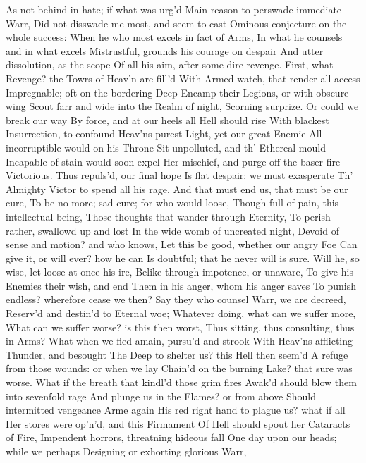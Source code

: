 \documentclass[11pt]{book}
\begin{document}
As not behind in hate; if what was urg'd 
Main reason to perswade immediate Warr, 
Did not disswade me most, and seem to cast 
Ominous conjecture on the whole success: 
When he who most excels in fact of Arms, 
In what he counsels and in what excels 
Mistrustful, grounds his courage on despair 
And utter dissolution, as the scope 
Of all his aim, after some dire revenge. 
First, what Revenge? the Towrs of Heav'n are fill'd 
With Armed watch, that render all access 
Impregnable; oft on the bordering Deep 
Encamp their Legions, or with obscure wing 
Scout farr and wide into the Realm of night, 
Scorning surprize.  Or could we break our way 
By force, and at our heels all Hell should rise 
With blackest Insurrection, to confound 
Heav'ns purest Light, yet our great Enemie 
All incorruptible would on his Throne 
Sit unpolluted, and th' Ethereal mould 
Incapable of stain would soon expel 
Her mischief, and purge off the baser fire 
Victorious.  Thus repuls'd, our final hope 
Is flat despair: we must exasperate 
Th' Almighty Victor to spend all his rage, 
And that must end us, that must be our cure, 
To be no more; sad cure; for who would loose, 
Though full of pain, this intellectual being, 
Those thoughts that wander through Eternity, 
To perish rather, swallowd up and lost 
In the wide womb of uncreated night, 
Devoid of sense and motion? and who knows, 
Let this be good, whether our angry Foe 
Can give it, or will ever? how he can 
Is doubtful; that he never will is sure. 
Will he, so wise, let loose at once his ire, 
Belike through impotence, or unaware, 
To give his Enemies their wish, and end 
Them in his anger, whom his anger saves 
To punish endless? wherefore cease we then? 
Say they who counsel Warr, we are decreed, 
Reserv'd and destin'd to Eternal woe; 
Whatever doing, what can we suffer more, 
What can we suffer worse? is this then worst, 
Thus sitting, thus consulting, thus in Arms? 
What when we fled amain, pursu'd and strook 
With Heav'ns afflicting Thunder, and besought 
The Deep to shelter us? this Hell then seem'd 
A refuge from those wounds: or when we lay 
Chain'd on the burning Lake? that sure was worse. 
What if the breath that kindl'd those grim fires 
Awak'd should blow them into sevenfold rage 
And plunge us in the Flames? or from above 
Should intermitted vengeance Arme again 
His red right hand to plague us? what if all 
Her stores were op'n'd, and this Firmament 
Of Hell should spout her Cataracts of Fire, 
Impendent horrors, threatning hideous fall 
One day upon our heads; while we perhaps 
Designing or exhorting glorious Warr, 
\end{document}
